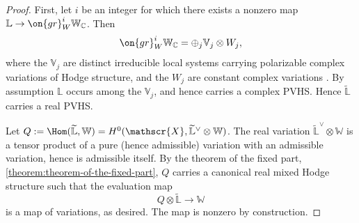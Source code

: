 	\begin{proof}
	First, let $i$ be an integer for which there exists a nonzero map $\mathbb{L}\to
	\on{gr}^i_W\mathbb{W}_\mathbb{C}$. Then $$\on{gr}^i_W
	\mathbb{W}_\mathbb{C}=\oplus_j \mathbb{V}_j\otimes W_j,$$ where the
	$\mathbb{V}_j$ are distinct irreducible local systems carrying
	polarizable complex variations of Hodge structure, and the $W_j$ are
	constant complex variations \cite[Proposition 4.1.4(2)]{LL:geometric-local-systems}. By assumption $\mathbb{L}$
	occurs among the $\mathbb{V}_j$, and hence carries a complex PVHS.
	Hence
	$\widetilde{\mathbb{L}}$ carries a real PVHS.

		Let $Q:=\Hom(\widetilde{\mathbb{L}},
		\mathbb{W})=H^0(\mathscr{X}, \widetilde{\mathbb{L}}^\vee\otimes
		\mathbb{W})$. The real variation
		$\widetilde{\mathbb{L}}^\vee\otimes \mathbb{W}$ is a tensor
		product of a pure (hence admissible) variation with an
		admissible variation, hence is admissible itself. By the theorem
		of the fixed part, \autoref{theorem:theorem-of-the-fixed-part}, $Q$ carries a canonical real mixed Hodge structure such that the evaluation map $$Q\otimes \widetilde{\mathbb{L}}\to \mathbb{W}$$ is a map of variations, as desired. The map is nonzero by construction.
	\end{proof}


